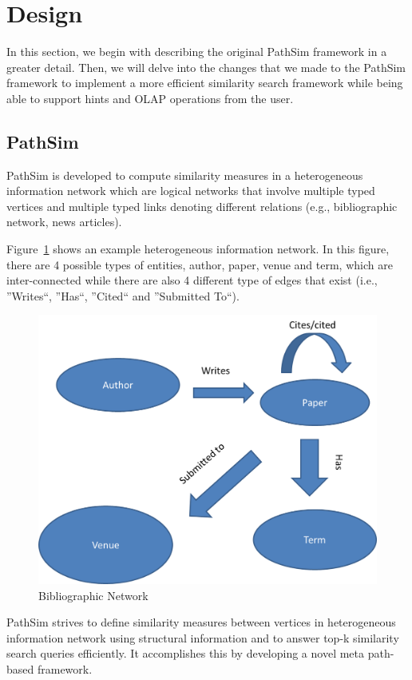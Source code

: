 \section{Design}
\label{sec:design}

In this section, we begin with describing the original PathSim framework in a greater detail.
Then, we will delve into the changes that we made to the PathSim framework to
implement a more efficient similarity search framework while being able to
support hints and OLAP operations from the user.

\subsection{PathSim}

PathSim is developed to compute
similarity measures in a heterogeneous information network which are logical
networks that involve multiple typed vertices and multiple typed links denoting
different relations (e.g., bibliographic network, news articles).

Figure~\ref{fig:relationship} shows an example heterogeneous information
network.  In this figure, there are 4 possible types of entities, author,
paper, venue and term, which are inter-connected while there are also 4
different type of edges that exist (i.e., ''Writes``, ''Has``, ''Cited`` and
''Submitted To``).

\begin{figure}[H]
    \centering
    \includegraphics[width=0.6\linewidth]{./figs/relationship.png}
    \caption{Bibliographic Network}
    \label{fig:relationship}
\end{figure}

PathSim strives to define similarity measures between vertices in heterogeneous
information network using structural information and to answer top-k similarity
search queries efficiently. It accomplishes this by developing a novel meta
path-based framework.

